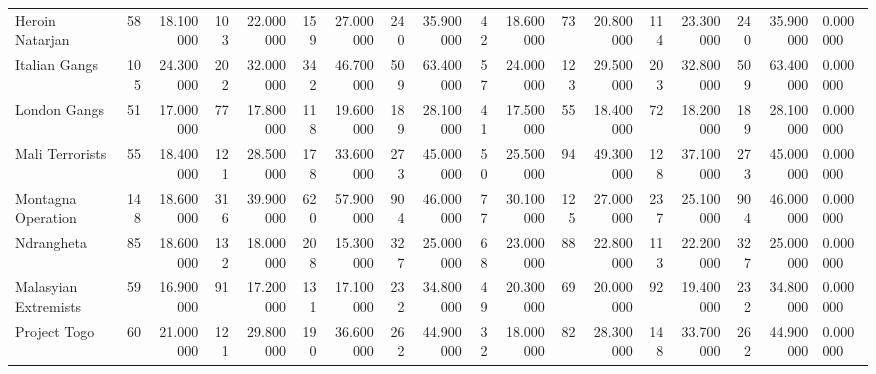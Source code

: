 \begin{tabular}{lrrrrrrrrrrrrrrrrl}
Heroin Natarjan & 58 & 18.100000 & 103 & 22.000000 & 159 & 27.000000 & 240 & 35.900000 & 42 & 18.600000 & 73 & 20.800000 & 114 & 23.300000 & 240 & 35.900000 & 0.000000 \\
Italian Gangs & 105 & 24.300000 & 202 & 32.000000 & 342 & 46.700000 & 509 & 63.400000 & 57 & 24.000000 & 123 & 29.500000 & 203 & 32.800000 & 509 & 63.400000 & 0.000000 \\
London Gangs & 51 & 17.000000 & 77 & 17.800000 & 118 & 19.600000 & 189 & 28.100000 & 41 & 17.500000 & 55 & 18.400000 & 72 & 18.200000 & 189 & 28.100000 & 0.000000 \\
Mali Terrorists & 55 & 18.400000 & 121 & 28.500000 & 178 & 33.600000 & 273 & 45.000000 & 50 & 25.500000 & 94 & 49.300000 & 128 & 37.100000 & 273 & 45.000000 & 0.000000 \\
Montagna Operation & 148 & 18.600000 & 316 & 39.900000 & 620 & 57.900000 & 904 & 46.000000 & 77 & 30.100000 & 125 & 27.000000 & 237 & 25.100000 & 904 & 46.000000 & 0.000000 \\
Ndrangheta & 85 & 18.600000 & 132 & 18.000000 & 208 & 15.300000 & 327 & 25.000000 & 68 & 23.000000 & 88 & 22.800000 & 113 & 22.200000 & 327 & 25.000000 & 0.000000 \\
Malasyian Extremists & 59 & 16.900000 & 91 & 17.200000 & 131 & 17.100000 & 232 & 34.800000 & 49 & 20.300000 & 69 & 20.000000 & 92 & 19.400000 & 232 & 34.800000 & 0.000000 \\
Project Togo & 60 & 21.000000 & 121 & 29.800000 & 190 & 36.600000 & 262 & 44.900000 & 32 & 18.000000 & 82 & 28.300000 & 148 & 33.700000 & 262 & 44.900000 & 0.000000 \\
\end{tabular}
